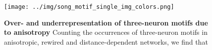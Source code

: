 \begin{figure}[h]

\centering

\texttt{[image: ../img/song\_motif\_single\_img\_colors.png]}

\caption{{\bf Over- and underrepresentation of three-neuron motifs due
  to anisotropy}
  Counting the occurrences of three-neuron motifs in anisotropic,
  rewired and distance-dependent networks, we find that }
\label{fig_three-neuron}%
\end{figure}
